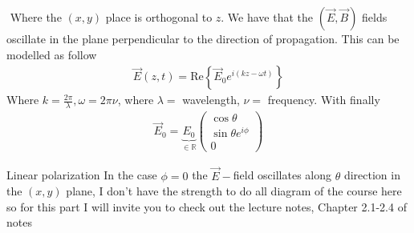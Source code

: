 \begin{parag}{$ $}
    Where the $\left(x, y\right)$ place is orthogonal to $z$. We have that the $\left(\vec{E}, \vec{B}\right)$ fields oscillate in the plane perpendicular to the direction of propagation. This can be modelled as follow 
	\begin{align*} 
		\vec{E}\left(z, t\right) = \text{Re}\left\{\vec{E}_0 e^{i\left(kz - \omega t\right)}\right\} 
	\end{align*}
	Where $k = \frac{2\pi}{\lambda}, \omega = 2\pi \nu$, where $\lambda = $ wavelength, $\nu = $ frequency. With finally 
	\begin{align*} 
		\vec{E}_0 =  \underbrace{E_0}_{\in \mathbb{R}} \begin{pmatrix} \cos \theta \\ \sin \theta e^{i \phi} \\ 0 \end{pmatrix} 
	\end{align*}
	\begin{subparag}{Linear polarization}
	    In the case $\phi = 0$ the $\vec{E}-$field oscillates along $\theta$ direction in the $\left(x, y\right)$ plane, I don't have the strength to do all diagram of the course here so for this part I will invite you to check out the lecture notes, Chapter 2.1-2.4 of notes
	\end{subparag}
\end{parag}

